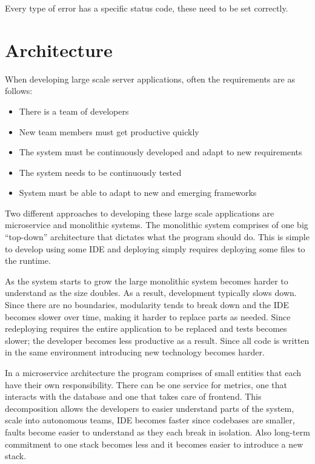 Every type of error has a specific status code, these need to be set correctly.

\section{Architecture} 

When developing large scale server applications, often the requirements are as
follows:

\begin{itemize}
    \item There is a team of developers
    \item New team members must get productive quickly
    \item The system must be continuously developed and adapt to new
        requirements
    \item The system needs to be continuously tested
    \item System must be able to adapt to new and emerging frameworks
\end{itemize}

Two different approaches to developing these large scale applications are
microservice and monolithic systems. The monolithic system comprises of one big
``top-down'' architecture that dictates what the program should do. This is
simple to develop using some IDE and deploying simply requires deploying some
files to the runtime. 

As the system starts to grow the large monolithic system becomes harder to
understand as the size doubles. As a result, development typically slows down.
Since there are no boundaries, modularity tends to break down and the IDE
becomes slower over time, making it harder to replace parts as needed. Since
redeploying requires the entire application to be replaced and tests becomes
slower; the developer becomes less productive as a result. Since all code is
written in the same environment introducing new technology becomes harder.

In a microservice architecture the program comprises of small entities that each
have their own responsibility. There can be one service for metrics, one that
interacts with the database and one that takes care of frontend. This
decomposition allows the developers to easier understand parts of the system,
scale into autonomous teams, IDE becomes faster since codebases are smaller,
faults become easier to understand as they each break in isolation.  Also
long-term commitment to one stack becomes less and it becomes easier to
introduce a new stack. 


